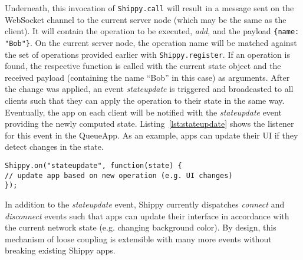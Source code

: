 Underneath, this invocation of \texttt{Shippy.call} will result in a message sent on the WebSocket channel to the current server node (which may be the same as the client).
It will contain the operation to be executed, \textit{add}, and the payload \texttt{\{name: "Bob"\}}.
On the current server node, the operation name will be matched against the set of operations provided earlier with \texttt{Shippy.register}.
If an operation is found, the respective function is called with the current state object and the received payload (containing the name ``Bob'' in this case) as arguments.
After the change was applied, an event \textit{stateupdate} is triggered and broadcasted to all clients such that they can apply the operation to their state in the same way.
Eventually, the app on each client will be notified with the \textit{stateupdate} event providing the newly computed state.
Listing~\ref{lst:stateupdate} shows the listener for this event in the QueueApp. As an example, apps can update their UI if they detect changes in the state.

\begin{lstlisting}[caption={stateupdate listener},label={lst:stateupdate}]
Shippy.on("stateupdate", function(state) {
// update app based on new operation (e.g. UI changes)
});
\end{lstlisting}

In addition to the \textit{stateupdate} event, Shippy currently dispatches \textit{connect} and \textit{disconnect} events such that apps can update their interface in accordance with the current network state (e.g. changing background color).
By design, this mechanism of loose coupling is extensible with many more events without breaking existing Shippy apps.